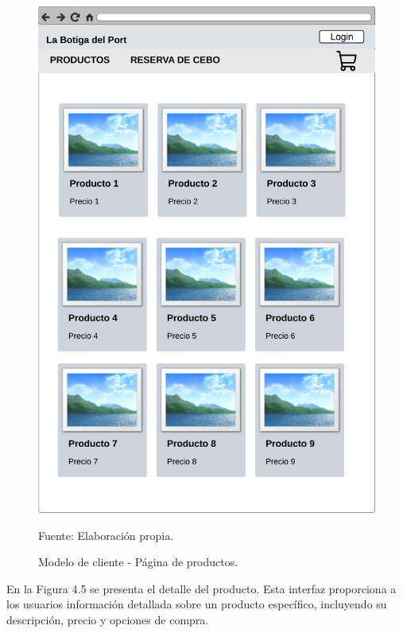 \begin{figure}[H]
\begin{center}
\includegraphics[scale=0.5]{./Images/productos.png}
\caption{Modelo de cliente - Página de productos.} Fuente: Elaboración propia.

\label{fig:fig4}

\end{center}
\end{figure}

En la Figura 4.5 se presenta el detalle del producto. Esta interfaz proporciona a los usuarios información detallada sobre un producto específico, incluyendo su descripción, precio y opciones de compra. 

